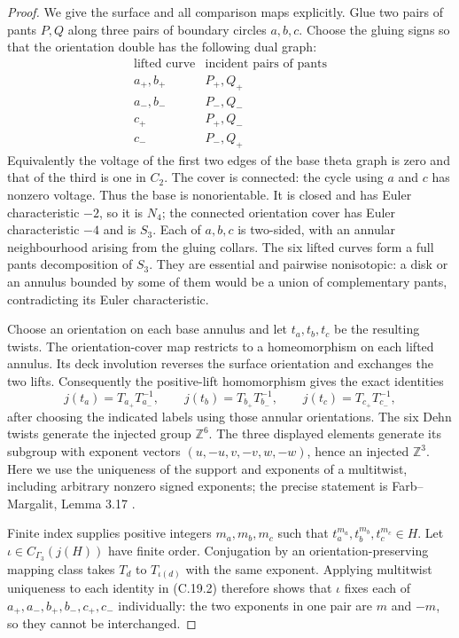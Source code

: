 \begin{proof}
We give the surface and all comparison maps explicitly. Glue two
pairs of pants $P,Q$ along three pairs of boundary circles
$a,b,c$. Choose the gluing signs so that the orientation double
has the following dual graph:
\[
\begin{array}{c|c}
\text{lifted curve}&\text{incident pairs of pants}\\ \hline
a_+,b_+&P_+,Q_+\\
a_-,b_-&P_-,Q_-\\
c_+&P_+,Q_-\\
c_-&P_-,Q_+
\end{array}
\tag{C.19.1}
\]
Equivalently the voltage of the first two edges of the base
theta graph is zero and that of the third is one in $C_2$.
The cover is connected: the cycle using $a$ and $c$ has nonzero
voltage. Thus the base is nonorientable. It is closed and has
Euler characteristic $-2$, so it is $N_4$; the connected
orientation cover has Euler characteristic $-4$ and is $S_3$.
Each of $a,b,c$ is two-sided, with an annular neighbourhood
arising from the gluing collars. The six lifted curves form a
full pants decomposition of $S_3$. They are essential and
pairwise nonisotopic: a disk or an annulus bounded by some
of them would be a union of complementary pants, contradicting
its Euler characteristic.

Choose an orientation on each base annulus and let
$t_a,t_b,t_c$ be the resulting twists. The orientation-cover map
restricts to a homeomorphism on each lifted annulus. Its deck
involution reverses the surface orientation and exchanges the
two lifts. Consequently the positive-lift homomorphism gives
the exact identities
\[
 j(t_a)=T_{a_+}T_{a_-}^{-1},\qquad
 j(t_b)=T_{b_+}T_{b_-}^{-1},\qquad
 j(t_c)=T_{c_+}T_{c_-}^{-1},
\tag{C.19.2}
\]
after choosing the indicated labels using those annular
orientations. The six Dehn twists generate the injected group
$\mathbb Z^6$. The three displayed elements generate its
subgroup with exponent vectors
$(u,-u,v,-v,w,-w)$, hence an injected $\mathbb Z^3$.
Here we use the uniqueness of the support and exponents of a
multitwist, including arbitrary nonzero signed exponents;
the precise statement is Farb--Margalit, Lemma 3.17
\cite{CextraFarbMargalit}.

Finite index supplies positive integers $m_a,m_b,m_c$ such that
$t_a^{m_a},t_b^{m_b},t_c^{m_c}\in H$.
Let $\iota\in C_{\Gamma_3}(j(H))$ have finite order.
Conjugation by an orientation-preserving mapping class takes
$T_d$ to $T_{\iota(d)}$ with the same exponent.
Applying multitwist uniqueness to each identity in (C.19.2)
therefore shows that $\iota$ fixes each of
$a_+,a_-,b_+,b_-,c_+,c_-$ individually: the two exponents in
one pair are $m$ and $-m$, so they cannot be interchanged.


\end{proof}
